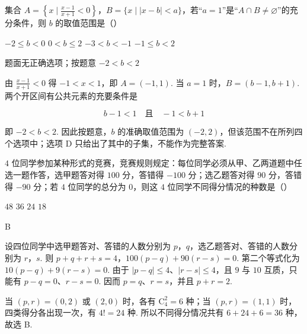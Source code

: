 \begin{problem}
集合 \(A = \left\{x \mid \frac{x - 1}{x + 1} < 0\right\}\)，\(B = \{x \mid |x - b| < a\}\)，若“\(a = 1\)”是“\(A \cap B \neq \varnothing\)”的充分条件，则 \(b\) 的取值范围是（\quad）

\choices
    {\(-2 \leqslant b < 0\)}
    {\(0 < b \leqslant 2\)}
    {\(-3 < b < -1\)}
    {\(-1 \leqslant b < 2\)}

\begin{answer}
题面无正确选项；按题意 \(-2<b<2\)
\end{answer}

\begin{solution}
由 \(\frac{x-1}{x+1}<0\) 得 \(-1<x<1\)，即 \(A=(-1,1)\). 当 \(a=1\) 时，\(B=(b-1,b+1)\). 两个开区间有公共元素的充要条件是

\[
b-1<1\quad\text{且}\quad -1<b+1
\]

即 \(-2<b<2\). 因此按题意，\(b\) 的准确取值范围为 \((-2,2)\)，但该范围不在所列四个选项中；选项 D 只给出了其中的子集，不能作为完整答案.
\end{solution}
\end{problem}

\begin{problem}
\(4\) 位同学参加某种形式的竞赛，竞赛规则规定：每位同学必须从甲、乙两道题中任选一题作答，选甲题答对得 \(100\) 分，答错得 \(-100\) 分；选乙题答对得 \(90\) 分，答错得 \(-90\) 分；若 \(4\) 位同学的总分为 \(0\)，则这 \(4\) 位同学不同得分情况的种数是（\quad）

\choices
    {\(48\)}
    {\(36\)}
    {\(24\)}
    {\(18\)}

\begin{answer}
B
\end{answer}

\begin{solution}
设四位同学中选甲题答对、答错的人数分别为 \(p\)，\(q\)，选乙题答对、答错的人数分别为 \(r\)，\(s\). 则
\(p+q+r+s=4\)，\(100(p-q)+90(r-s)=0\).
第二个等式化为 \(10(p-q)+9(r-s)=0\). 由于 \(\lvert p-q\rvert\leqslant4\)、\(\lvert r-s\rvert\leqslant4\)，且 \(9\) 与 \(10\) 互质，只能有 \(p-q=0\)、\(r-s=0\). 因而 \(p=q\)、\(r=s\)，并且 \(p+r=2\).

当 \((p,r)=(0,2)\) 或 \((2,0)\) 时，各有 \(\mathrm C_4^2=6\) 种；当 \((p,r)=(1,1)\) 时，四类得分各出现一次，有 \(4!=24\) 种. 所以不同得分情况共有 \(6+24+6=36\) 种，故选 B.
\end{solution}
\end{problem}

